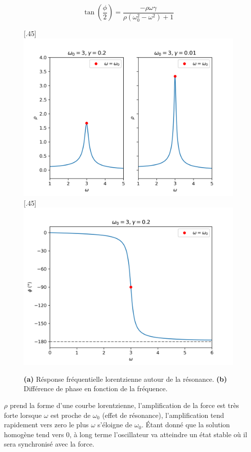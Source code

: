 \begin{dmath}
    \tan(\frac{\phi}{2}) = \frac{-\rho\omega\gamma}{\rho(\omega_0^2 - \omega^2) + 1}
\end{dmath}
%
\begin{figure}[!t]
    \centering
    \begin{subcaptionblock}{.90\linewidth}
        \subcaptionbox{}[.45\linewidth]{%
        \includegraphics[width=\linewidth]{images/harmonique/rho_plot_contrast.png}%
        }%
        \hfill
        \subcaptionbox{}[.45\linewidth]{%
        \includegraphics[width=\linewidth]{images/harmonique/frequency_phase_shift.png}%
        }
    \end{subcaptionblock}
    \caption{\textbf{(a)} Résponse fréquentielle lorentzienne autour de la résonance. \textbf{(b)} Différence de phase en fonction de la fréquence.}
\end{figure}
%
$\rho$ prend la forme d’une courbe lorentzienne, l’amplification 
de la force est très forte lorsque $\omega$ est proche de $\omega_0$ 
(effet de résonance), l’amplification tend rapidement vers zero 
le plus $\omega$ s’éloigne de $\omega_0$.
%
Étant donné que la solution homogène tend vers $0$, à long terme l'oscillateur va atteindre un état stable où il sera synchronisé avec la force.

